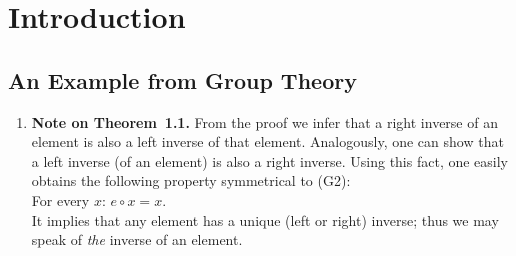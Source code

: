 \chapter{Introduction}
\section{An Example from Group Theory}
\begin{enumerate}[1.]
\item \textbf{Note on Theorem~1.1.} From the proof we infer that a right inverse of an element is also a left inverse of that element. Analogously, one can show that a left inverse (of an element) is also a right inverse. Using this fact, one easily obtains the following property symmetrical to (G2):\medskip\\
For every $x$: \quad $e \circ x = x$.\medskip\\
It implies that any element has a unique (left or right) inverse; thus we may speak of \emph{the} inverse of an element.
\end{enumerate}
